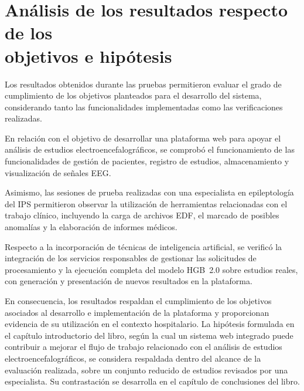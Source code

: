 \clearpage
\section[Análisis de los resultados respecto de los objetivos e hipótesis]{Análisis de los resultados respecto de los \\objetivos e hipótesis}

Los resultados obtenidos durante las pruebas
permitieron evaluar el grado de cumplimiento
de los objetivos planteados para el desarrollo
del sistema, considerando tanto las
funcionalidades implementadas como las
verificaciones realizadas.

En relación con el objetivo de desarrollar
una plataforma web para apoyar el análisis
de estudios electroencefalográficos, se
comprobó el funcionamiento de las
funcionalidades de gestión de pacientes,
registro de estudios, almacenamiento y
visualización de señales EEG.

Asimismo, las sesiones de prueba realizadas
con una especialista en epileptología del
IPS permitieron observar la utilización de
herramientas relacionadas con el trabajo
clínico, incluyendo la carga de archivos
EDF, el marcado de posibles anomalías
y la elaboración de informes médicos.


Respecto a la incorporación de técnicas de inteligencia artificial, se verificó la integración de los servicios responsables de gestionar las solicitudes de procesamiento y la ejecución completa del modelo HGB~2.0 sobre estudios reales, con generación y presentación de nuevos resultados en la plataforma.


En consecuencia, los resultados respaldan el cumplimiento de los objetivos asociados al desarrollo e implementación de la plataforma y proporcionan evidencia de su utilización en el contexto hospitalario.
La hipótesis formulada en el capítulo introductorio del libro, según la cual un sistema web integrado puede contribuir a mejorar el flujo de trabajo relacionado con el análisis de estudios electroencefalográficos, se considera respaldada dentro del alcance de la evaluación realizada, sobre un conjunto reducido de estudios revisados por una especialista.
Su contrastación se desarrolla en el capítulo de conclusiones del libro.
